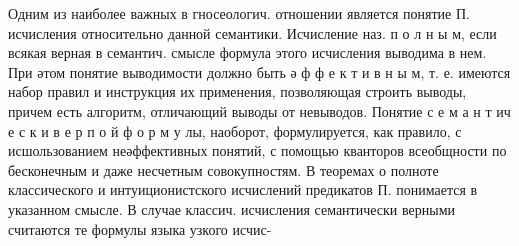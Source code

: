 \documentclass[10pt]{article}
\begin{document}
Одним из наиболее важных в гносеологич. отношении является понятие П. исчисления относительно данной семантики. Исчисление наз. п о л н ы м, если всякая верная в семантич. смысле формула этого исчисления выводима в нем. При әтом понятие выводимости должно быть ә ф ф е к т и в н ы м, т. е. имеются набор правил и инструкция их применения, позволяющая строить выводы, причем есть алгоритм, отличающий выводы от невыводов. Понятие с е м а н т ич е с к и в е р п о й ф о р м у лы, наоборот, формулируется, как правило, с исшользованием неәффективных понятий, с помощью кванторов всеобщности по бесконечным и даже несчетным совокупностям. В теоремах о полноте классического и интуиционистского исчислений предикатов П. понимается в указанном смысле. В случае классич. исчисления семантически верными считаются те формулы языка узкого исчис-
\end{document}
